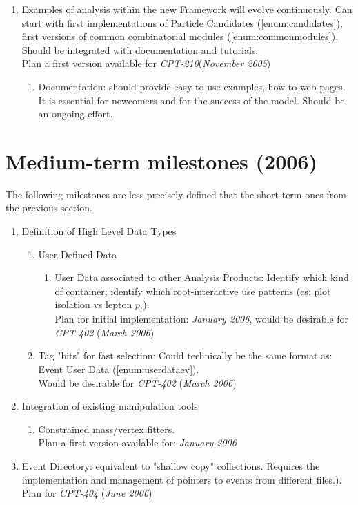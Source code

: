 \documentclass[draftmode]{memarticle}
\begin{document}
\begin{enumerate}
  \item Examples of analysis within the new Framework
       will evolve continuously.
       Can start with
         first implementations of Particle
         Candidates (\ref{enum:candidates}), 
         first versions of common combinatorial modules
         (\ref{enum:commonmodules}). 
       Should be integrated with documentation and tutorials.\\
       Plan a first version available for {\em CPT-210}({\em November 2005})
  \begin{enumerate}
  \item Documentation:
       should provide easy-to-use examples, how-to web pages.
       It is essential for newcomers and for the success of
       the model. Should be an ongoing effort.
  \end{enumerate}
\end{enumerate}

\section {Medium-term milestones (2006)}

The following milestones are less precisely defined
that the short-term ones from the previous section.

\begin{enumerate}
  \item Definition of High Level Data Types
  \begin{enumerate}
     \item User-Defined Data 
    \begin{enumerate}
      \item User Data associated to other Analysis Products:
               Identify which kind of container;
               identify which root-interactive use patterns 
               (es: plot isolation vs lepton $p_t$). \\
           Plan for initial implementation: {\em January 2006}, 
           would be desirable for {\em CPT-402} ({\em March 2006})
    \end{enumerate}
    \item Tag "bits" for fast selection: 
           Could technically be the same format as:
             Event User Data (\ref{enum:userdataev}). \\
          Would be desirable for {\em CPT-402} ({\em March 2006})
  \end{enumerate}
  \item Integration of existing manipulation tools
  \begin{enumerate}
    \item Constrained mass/vertex fitters.\\
       Plan a first version available for: {\em January 2006}
  \end{enumerate}
  \item Event Directory:
       equivalent to "shallow copy" collections. Requires the
       implementation and management of pointers to events from
       different files.). \\
           Plan for {\em CPT-404} ({\em June 2006})
\end{enumerate}
\end{document}
